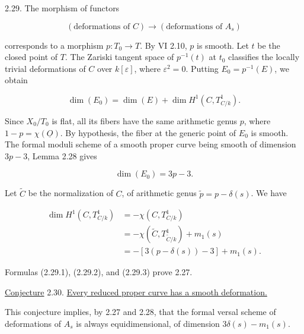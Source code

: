 
2.29. The morphism of functors

\begin{equation*}
(\text{deformations of }C)\longrightarrow(\text{deformations of }A_s)
\end{equation*}

corresponds to a morphism $p:T_0\longrightarrow T$.  By VI 2.10, $p$ is
smooth.  Let $t$ be the closed point of $T$.  The Zariski tangent space of
$p^{-1}(t)$ at $t_0$ classifies the locally trivial deformations of $C$ over
$k[\varepsilon]$, where $\varepsilon^2=0$.  Putting $E_0=p^{-1}(E)$, we obtain

\begin{equation}\tag{2.29.1}
\dim(E_0)=\dim(E)+\dim H^1(C,T^1_{C/k}).
\end{equation}

Since $X_0/T_0$ is flat, all its fibers have the same arithmetic genus $p$,
where $1-p=\chi(\underline O)$.  By hypothesis, the fiber at the generic point
of $E_0$ is smooth.  The formal moduli scheme of a smooth proper curve being
smooth of dimension $3p-3$, Lemma 2.28 gives

\begin{equation}\tag{2.29.2}
\dim(E_0)=3p-3.
\end{equation}

Let $\widetilde C$ be the normalization of $C$, of arithmetic genus
$\widetilde p=p-\delta(s)$.  We have

\begin{equation}\tag{2.29.3}
\begin{aligned}
\dim H^1(C,T^1_{C/k})
&=-\chi(C,T^1_{C/k})\\
&=-\chi(\widetilde C,T^1_{\widetilde C/k})+m_1(s)\\
&=-[3(p-\delta(s))-3]+m_1(s).
\end{aligned}
\end{equation}

Formulas (2.29.1), (2.29.2), and (2.29.3) prove 2.27.

\underline{Conjecture} 2.30. \underline{Every reduced proper curve has a
smooth deformation.}

This conjecture implies, by 2.27 and 2.28, that the formal versal scheme of
deformations of $A_s$ is always equidimensional, of dimension
$3\delta(s)-m_1(s)$.


